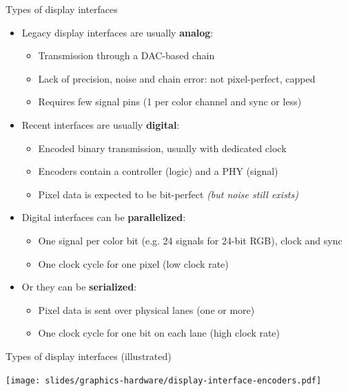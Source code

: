 \begin{frame}{Types of display interfaces}
  \begin{itemize}
  \item Legacy display interfaces are usually \textbf{analog}:
  \begin{itemize}
    \item Transmission through a DAC-based chain
    \item Lack of precision, noise and chain error: not pixel-perfect, capped
    \item Requires few signal pins (1 per color channel and sync or less)
  \end{itemize}
  \item Recent interfaces are usually \textbf{digital}:
    \begin{itemize}
    \item Encoded binary transmission, usually with dedicated clock
    \item Encoders contain a controller (logic) and a PHY (signal)
    \item Pixel data is expected to be bit-perfect \textit{(but noise still exists)}
    \end{itemize}
  \item Digital interfaces can be \textbf{parallelized}:
    \begin{itemize}
    \item One signal per color bit (e.g. 24 signals for 24-bit RGB), clock and sync
    \item One clock cycle for one pixel (low clock rate)
    \end{itemize}
  \item Or they can be \textbf{serialized}:
    \begin{itemize}
    \item Pixel data is sent over physical lanes (one or more)
    \item One clock cycle for one bit on each lane (high clock rate)
    \end{itemize}
  \end{itemize}
\end{frame}

\begin{frame}{Types of display interfaces (illustrated)}
  \begin{center}
    \texttt{[image: slides/graphics-hardware/display-interface-encoders.pdf]}
  \end{center}
\end{frame}

